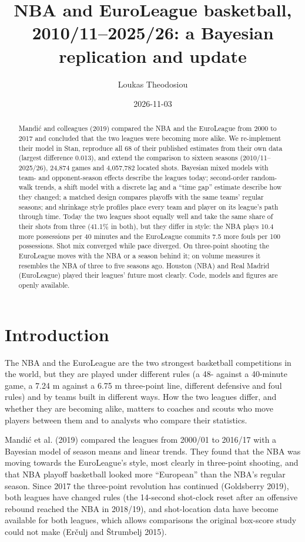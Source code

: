 \documentclass[
  11pt,
  a4paper,
]{article}
\title{NBA and EuroLeague basketball, 2010/11--2025/26: a Bayesian
replication and update}
\author{Loukas Theodosiou}
\date{2026-11-03}
\begin{document}
\maketitle
\begin{abstract}
Mandić and colleagues (2019) compared the NBA and the EuroLeague from
2000 to 2017 and concluded that the two leagues were becoming more
alike. We re-implement their model in Stan, reproduce all 68 of their
published estimates from their own data (largest difference 0.013), and
extend the comparison to sixteen seasons (2010/11--2025/26), 24,874
games and 4,057,782 located shots. Bayesian mixed models with team- and
opponent-season effects describe the leagues today; second-order
random-walk trends, a shift model with a discrete lag and a ``time gap''
estimate describe how they changed; a matched design compares playoffs
with the same teams' regular seasons; and shrinkage style profiles place
every team and player on its league's path through time. Today the two
leagues shoot equally well and take the same share of their shots from
three (41.1\% in both), but they differ in style: the NBA plays 10.4
more possessions per 40 minutes and the EuroLeague commits 7.5 more
fouls per 100 possessions. Shot mix converged while pace diverged. On
three-point shooting the EuroLeague moves with the NBA or a season
behind it; on volume measures it resembles the NBA of three to five
seasons ago. Houston (NBA) and Real Madrid (EuroLeague) played their
leagues' future most clearly. Code, models and figures are openly
available.
\end{abstract}

\section{Introduction}\label{introduction}

The NBA and the EuroLeague are the two strongest basketball competitions
in the world, but they are played under different rules (a 48- against a
40-minute game, a 7.24 m against a 6.75 m three-point line, different
defensive and foul rules) and by teams built in different ways. How the
two leagues differ, and whether they are becoming alike, matters to
coaches and scouts who move players between them and to analysts who
compare their statistics.

Mandić et al. (2019) compared the leagues from 2000/01 to 2016/17 with a
Bayesian model of season means and linear trends. They found that the
NBA was moving towards the EuroLeague's style, most clearly in
three-point shooting, and that NBA playoff basketball looked more
``European'' than the NBA's regular season. Since 2017 the three-point
revolution has continued (Goldsberry 2019), both leagues have changed
rules (the 14-second shot-clock reset after an offensive rebound reached
the NBA in 2018/19), and shot-location data have become available for
both leagues, which allows comparisons the original box-score study
could not make (Erčulj and Štrumbelj 2015).
\end{document}
